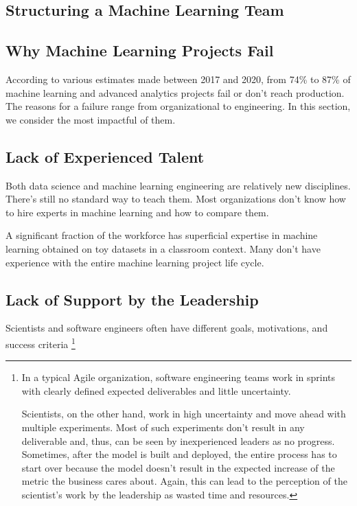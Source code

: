 \subsection{Structuring a Machine Learning Team}




\subsection{Why Machine Learning Projects Fail}
According to various estimates made between 2017 and 2020,
from 74\% to 87\% of machine learning and advanced analytics
projects fail or don't reach production. The reasons for
a failure range from organizational to engineering.
In this section, we consider the most impactful of them.



\subsection*{Lack of Experienced Talent}
Both data science and machine learning engineering are
relatively new disciplines. There's still no standard
way to teach them. Most organizations don't know how
to hire experts in machine learning and how to compare
them.

A significant fraction of the workforce has superficial
expertise in machine learning obtained on toy datasets
in a classroom context. Many don't have experience with
the entire machine learning project life cycle.



\subsection*{Lack of Support by the Leadership}
Scientists and software engineers often have different goals,
motivations, and success criteria
\footnote{
    In a typical Agile organization, software engineering
    teams work in sprints with clearly defined expected
    deliverables and little uncertainty.

    Scientists, on the other hand, work in high uncertainty
    and move ahead with multiple experiments. Most of such
    experiments don't result in any deliverable and, thus,
    can be seen by inexperienced leaders as no progress.
    Sometimes, after the model is built and deployed,
    the entire process has to start over because the model
    doesn't result in the expected increase of the metric
    the business cares about. Again, this can lead to the
    perception of the scientist's work by the leadership
    as wasted time and resources.
}

